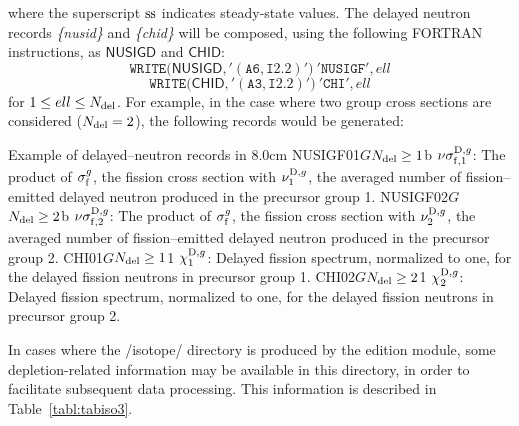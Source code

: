 \noindent where the superscript ${\rm ss}$ indicates steady-state values. The
delayed neutron records {\sl \{nusid\}} and {\sl \{chid\}} will be
composed, using the following FORTRAN instructions, as $\mathsf{NUSIGD}$ and $\mathsf{CHID}$:
  \begin{displaymath}
    \mathtt{WRITE(}\mathsf{NUSIGD}\mathtt{,'(A6,I2.2)')} \ \mathtt{'NUSIGF'},ell
  \end{displaymath}
  \begin{displaymath}
    \mathtt{WRITE(}\mathsf{CHID}\mathtt{,'(A3,I2.2)')} \ \mathtt{'CHI'},ell
  \end{displaymath}
for $1\leq ell \leq N_{\rm del}$. For example, in the case where two group cross sections are considered
($N_{\rm del}=2$), the following records would be generated:

\begin{DescriptionEnregistrement}{Example of delayed--neutron records in
}{8.0cm}
\OptRealEnr
  {NUSIGF01}{$G$}{$N_{\rm del}\ge 1$}{b}
  {$\nu\sigma_{{\rm f},1}^{{\rm D},g}$: The product of $\sigma_{\rm f}^{g}$, the fission cross section with
   $\nu_1^{{\rm D},g}$, the averaged number of fission--emitted delayed
   neutron produced in the precursor group 1.}
\OptRealEnr
  {NUSIGF02}{$G$}{$N_{\rm del}\ge 2$}{b}
  {$\nu\sigma_{{\rm f},2}^{{\rm D},g}$: The product of $\sigma_{\rm f}^{g}$, the fission cross section with
   $\nu_2^{{\rm D},g}$, the averaged number of fission--emitted delayed
   neutron produced in the precursor group 2.}
\OptRealEnr
  {CHI01}{$G$}{$N_{\rm del}\ge 1$}{1}
  {$\chi^{{\rm D},g}_1$: Delayed fission spectrum,
   normalized to one, for the delayed fission neutrons in
   precursor group 1.}
\OptRealEnr
  {CHI02}{$G$}{$N_{\rm del}\ge 2$}{1}
  {$\chi^{{\rm D},g}_2$: Delayed fission spectrum,
   normalized to one, for the delayed fission neutrons in
   precursor group 2.}
\end{DescriptionEnregistrement}

\vskip 0.2cm

In cases where the /isotope/ directory is produced by the edition module, some
depletion-related information may be available in this directory, in order to facilitate
subsequent data processing. This information is described in
Table~\ref{tabl:tabiso3}.

